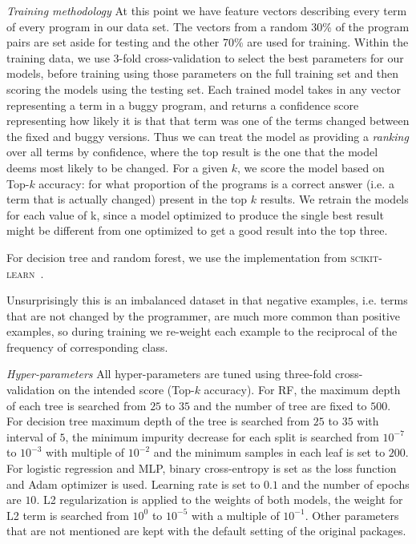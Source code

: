 \documentclass[conference]{IEEEtran}
\begin{document}
\emph{Training methodology}
At this point we have feature vectors describing every term of every program in
our data set. The vectors from a random 30\% of the program pairs are set aside for testing and
the other 70\% are used for training.
Within the training data, we use 3-fold
cross-validation to select the best parameters for our models, before training
using those parameters on the full training set and then scoring the models
using the testing set.
Each trained model takes in any vector representing a term
in a buggy program, and returns a confidence score representing how likely it is that
that term was one of the terms changed between the fixed and buggy versions.
Thus we can treat the model as providing a \emph{ranking} over all terms by
confidence, where the top result is the one that the model deems most likely
to be changed.
For a given $k$, we score the model based on Top-$k$ accuracy: for what
proportion of the programs is a correct answer (i.e. a term that is actually
changed) present in the top $k$ results.
We retrain the models for each value of k, since a model optimized to produce
the single best result might be different from one optimized to get a good
result into the top three.

For decision tree and random forest, we use the implementation from
\textsc{scikit-learn}~\cite{scikit-learn}.

Unsurprisingly this is an imbalanced dataset in that negative examples, i.e.
terms that are not changed by the programmer, are much more common than
positive examples, so during training we re-weight each example to the reciprocal
of the frequency of corresponding class.

\emph{Hyper-parameters}
All hyper-parameters are tuned using three-fold cross-validation on the
intended score (Top-$k$ accuracy).
For RF, the maximum depth of each tree is searched from $25$ to $35$ and the
number of tree are fixed to $500$.
For decision tree maximum depth of the tree is searched from $25$ to $35$ with interval of $5$,
the minimum impurity decrease for each split is searched from $10^{-7}$ to
$10^{-3}$ with multiple of $10^{-2}$ and the minimum samples in each leaf is set to $200$.
For logistic regression and MLP, binary cross-entropy is set as the loss
function and Adam \cite{kingma2014adam} optimizer is used.
Learning rate is set to $0.1$ and the number of epochs are $10$.
L2 regularization is applied to the weights of both models,
the weight for L2 term is searched from $10^0$ to $10^{-5}$ with a multiple of $10^{-1}$.
Other parameters that are not mentioned are kept with the default setting of the
original packages.
\end{document}
